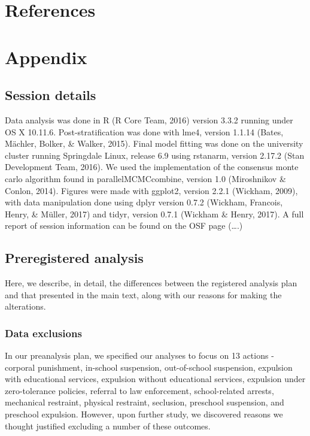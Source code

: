 \documentclass[english,floatsintext,man]{apa6}
\theoremstyle{definition}
\theoremstyle{definition}
\theoremstyle{remark}
\begin{document}
\section{References}\label{references}

\newpage

\section{Appendix}\label{appendix}

\subsection{Session details}\label{session-details}

Data analysis was done in R (R Core Team, 2016) version 3.3.2 running
under OS X 10.11.6. Post-stratification was done with lme4, version
1.1.14 (Bates, Mächler, Bolker, \& Walker, 2015). Final model fitting
was done on the university cluster running Springdale Linux, release 6.9
using rstanarm, version 2.17.2 (Stan Development Team, 2016). We used
the implementation of the consensus monte carlo algorithm found in
parallelMCMCcombine, version 1.0 (Miroshnikov \& Conlon, 2014). Figures
were made with ggplot2, version 2.2.1 (Wickham, 2009), with data
manipulation done using dplyr version 0.7.2 (Wickham, Francois, Henry,
\& Müller, 2017) and tidyr, version 0.7.1 (Wickham \& Henry, 2017). A
full report of session information can be found on the OSF page
(\ldots{}.)

\subsection{Preregistered analysis}\label{preregistered-analysis}

Here, we describe, in detail, the differences between the registered
analysis plan and that presented in the main text, along with our
reasons for making the alterations.

\subsubsection{Data exclusions}\label{data-exclusions}

In our preanalysis plan, we specified our analyses to focus on 13
actions - corporal punishment, in-school suspension, out-of-school
suspension, expulsion with educational services, expulsion without
educational services, expulsion under zero-tolerance policies, referral
to law enforcement, school-related arrests, mechanical restraint,
physical restraint, seclusion, preschool suspension, and preschool
expulsion. However, upon further study, we discovered reasons we thought
justified excluding a number of these outcomes.
\end{document}
